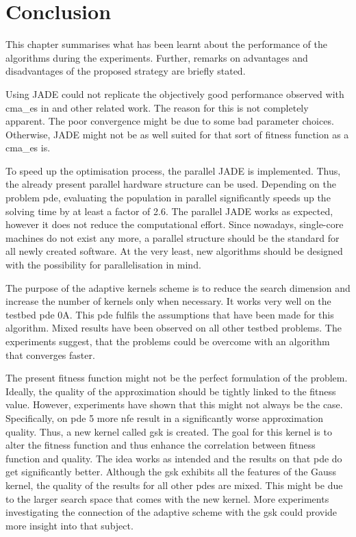\documentclass[./\jobname.tex]{subfiles}
\begin{document}
\chapter{Conclusion}
This chapter summarises what has been learnt about the performance of the algorithms during the experiments. Further, remarks on advantages and disadvantages of the proposed strategy are briefly stated. 

Using JADE could not replicate the objectively good performance observed with \gls{cma_es} in \cite{chaquet_using_2019} and other related work. The reason for this is not completely apparent. The poor convergence might be due to some bad parameter choices. Otherwise, JADE might not be as well suited for that sort of fitness function as a \gls{cma_es} is. 

To speed up the optimisation process, the parallel JADE is implemented. Thus, the already present parallel hardware structure can be used. Depending on the problem \gls{pde}, evaluating the population in parallel significantly speeds up the solving time by at least a factor of 2.6. The parallel JADE works as expected, however it does not reduce the computational effort. Since nowadays, single-core machines do not exist any more, a parallel structure should be the standard for all newly created software. At the very least, new algorithms should be designed with the possibility for parallelisation in mind. 

The purpose of the adaptive kernels scheme is to reduce the search dimension and increase the number of kernels only when necessary. It works very well on the testbed \gls{pde} 0A. This \gls{pde} fulfils the assumptions that have been made for this algorithm. Mixed results have been observed on all other testbed problems. The experiments suggest, that the problems could be overcome with an algorithm that converges faster. 

The present fitness function might not be the perfect formulation of the problem. Ideally, the quality of the approximation should be tightly linked to the fitness value. However, experiments have shown that this might not always be the case. Specifically, on \gls{pde} 5 more \gls{nfe} result in a significantly worse approximation quality. Thus, a new kernel called \gls{gsk} is created. The goal for this kernel is to alter the fitness function and thus enhance the correlation between fitness function and quality. The idea works as intended and the results on that \gls{pde} do get significantly better. Although the \gls{gsk} exhibits all the features of the Gauss kernel, the quality of the results for all other \gls{pde}s are mixed. This might be due to the larger search space that comes with the new kernel. More experiments investigating the connection of the adaptive scheme with the \gls{gsk} could provide more insight into that subject.
\end{document}
